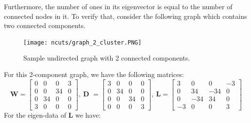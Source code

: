 \documentclass[a4paper]{article}
\begin{document}
Furthermore, the number of ones in its eigenvector is equal to the number of connected nodes in it. To verify that, consider the following graph which contains two connected components.
\begin{figure}[H]
	\centering %
    	\texttt{[image: ncuts/graph\_2\_cluster.PNG]}
    \caption{Sample undirected graph with 2 connected components.}
\end{figure}
For this 2-component graph, we have the following matrices:
\[
\textbf{W} = 
\begin{bmatrix}
0 & 0& 0& 3\\
0 & 0& 34& 0\\
0 & 34& 0& 0\\
3 & 0& 0& 0
\end{bmatrix}
,\
\textbf{D }= 
\begin{bmatrix}
3 & 0& 0& 0\\
0 & 34& 0& 0\\
0 & 0& 34& 0\\
0 & 0& 0& 3
\end{bmatrix}
,\
\textbf{L}=
\begin{bmatrix}
3 & 0& 0& -3\\
0 & 34& -34& 0\\
0 & -34& 34& 0\\
-3 & 0& 0& 3
\end{bmatrix}
\]
For the eigen-data of $\textbf{L}$ we have:
\end{document}
